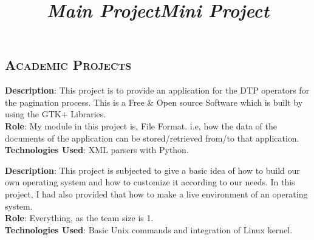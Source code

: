 \begin{resume}
\section{\textsc{Academic Projects}}
\title{\em \textbf{Main Project}}
\begin{position}
\textbf{Description}: This project is to provide an application for
the DTP operators for the pagination process. This is a Free \& Open
source Software which is built by using the GTK+ Libraries.\\
\textbf{Role}: My module in this project is, File Format. i.e, how the
data of the documents of the application can be stored/retrieved
from/to that application.\\
\textbf{Technologies Used}: XML parsers with Python.\\
\end{position}
\title{\em \textbf{Mini Project}}
\begin{position}
\textbf{Description}: This project is subjected to give a basic idea
of how to build our own operating system and how  to  customize it
according to our needs. In this project, I had also provided that how
to make a live environment of an operating system.\\
\textbf{Role}: Everything, as the team size is 1.\\
\textbf{Technologies Used}: Basic Unix commands and integration of
Linux kernel.\\
\end{position}




\begin{formatb}
  \\
  \body\\
\end{formatb}


\end{resume}
